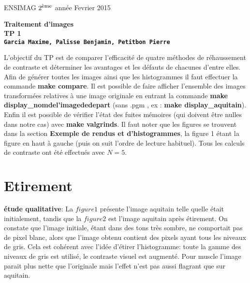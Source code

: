 \documentclass[12pt]{article}
\newcommand{\noi}{\noindent}
\numberwithin{equation}{section}
\begin{document}
\baselineskip7mm

\noi ENSIMAG $2^{\footnotesize \mbox{ème}}$ année   \hfill Fevrier 2015


\vspace{1cm}


\begin{center}
{\Large \bf Traitement d'images\\ TP 1 \\ \texttt{Garcia Maxime, Palisse Benjamin, Petitbon Pierre}}
\end{center}

\vspace{5mm}

L'objectif du TP est de comparer l'efficacité de quatre méthodes de réhaussement de contraste et déterminer les avantages et les défauts de chacunes d'entre elles. Afin de générer toutes les images ainsi que les histogrammes il faut effectuer la commande \textbf{make compare}. Il est possible de faire afficher l'ensemble des images transformées relatives à une image originale en entrant la commande \textbf{make display\_nomdel'imagededepart} (sans .pgm , ex : \textbf{make display\_aquitain}). Enfin il est possible de vérifier l'état des fuites mémoires (qui doivent être nulles dans notre cas) avec \textbf{make valgrinds}. Il faut noter que les figures se trouvent dans la section \textbf{Exemple de rendus et d'histogrammes}, la figure 1 étant la figure en haut à gauche (puis on suit l'ordre de lecture habituel). Tous les calculs de contraste ont été effectués avec $N = 5$.

\section{Etirement}

\textbf{étude qualitative}: La $figure 1$ présente l'image aquitain telle quelle était initialement, tandis que la $figure 2$ est l'image aquitain après étirement. On constate que l'image initiale, étant dans des tons très sombre, ne comportait pas de pixel blanc, alors que l'image obtenu contient des pixels ayant tous les niveaux de gris. Cela est cohérent avec l'idée d'étirer l'histogramme: toute la gamme des niveaux de gris est utilisé, le contraste visuel est augmenté. Pour muscle l'image parait plus nette que l'originale mais l'effet n'est pas aussi flagrant que sur aquitain.\\
\end{document}
